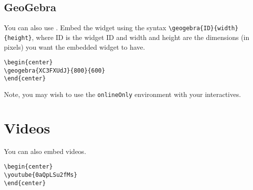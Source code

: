 \documentclass{ximera}
\begin{document}
\subsection{GeoGebra}

You can also use . Embed the
widget using the syntax \verb|\geogebra{ID}{width}{height}|, where ID
is the widget ID and width and height are the dimensions (in pixels)
you want the embedded widget to have.
\begin{center}
\end{center}

\begin{verbatim}
\begin{center}
\geogebra{XC3FXUdJ}{800}{600}
\end{center}
\end{verbatim}

Note, you may wish to use the \verb|onlineOnly| environment with your
interactives.

\section{Videos}

You can also embed  videos.
\begin{center}
\end{center}

\begin{verbatim}
\begin{center}
\youtube{0aQpLSu2fMs}
\end{center}
\end{verbatim}
\end{document}

